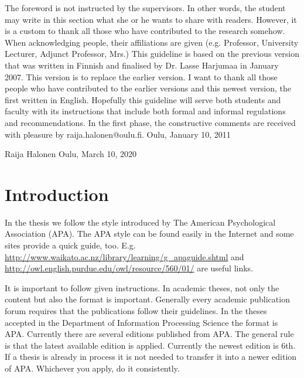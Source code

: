 \documentclass[a4paper,12pt]{article}
\begin{document}
The foreword is not instructed by the supervisors. In other words, the student may write in this section what she or he wants to share with readers. However, it is a custom to thank all those who have contributed to the research somehow. When acknowledging people, their affiliations are given (e.g. Professor, University Lecturer, Adjunct Professor, Mrs.) 
This guideline is based on the previous version that was written in Finnish and finalised by Dr. Lasse Harjumaa in January 2007. This version is to replace the earlier version. I want to thank all those people who have contributed to the earlier versions and this newest version, the first written in English.
Hopefully this guideline will serve both students and faculty with its instructions that include both formal and informal regulations and recommendations. In the first phase, the constructive comments are received with pleasure by raija.halonen@oulu.fi.
Oulu, January 10, 2011

Raija Halonen
Oulu, March 10, 2020

\newpage
\tableofcontents
{}

\newpage
\section{Introduction}

In the thesis we follow the style introduced by The American Psychological Association (APA). The APA style can be found easily in the Internet and some sites provide a quick guide, too. E.g. \url{http://www.waikato.ac.nz/library/learning/g_apaguide.shtml} and \url{http://owl.english.purdue.edu/owl/resource/560/01/} are useful links.

It is important to follow given instructions. In academic theses, not only the content but also the format is important. Generally every academic publication forum requires that the publications follow their guidelines. In the theses accepted in the Department of Information Processing Science the format is APA. Currently there are several editions published from APA. The general rule is that the latest available edition is applied. Currently the newest edition is 6th. If a thesis is already in process it is not needed to transfer it into a newer edition of APA. Whichever you apply, do it consistently.
\end{document}
